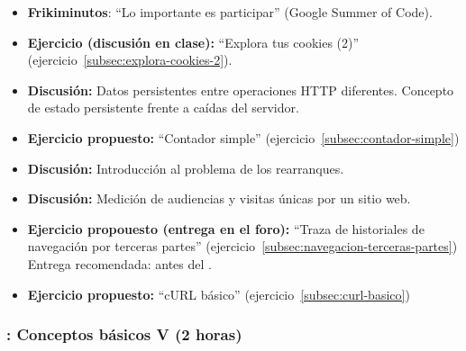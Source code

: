 \documentclass[a4paper,12pt]{article}
\begin{document}
\begin{itemize}
\item \textbf{Frikiminutos}: ``Lo importante es participar'' (Google Summer of Code).
\item \textbf{Ejercicio (discusión en clase):} ``Explora tus cookies (2)'' (ejercicio~\ref{subsec:explora-cookies-2}).
\item \textbf{Discusión:} Datos persistentes entre operaciones HTTP diferentes. Concepto de estado persistente frente a caídas del servidor.
\item \textbf{Ejercicio propuesto:} ``Contador simple'' (ejercicio~\ref{subsec:contador-simple})
\item \textbf{Discusión:} Introducción al problema de los rearranques.
\item \textbf{Discusión:} Medición de audiencias y visitas únicas por un sitio web.
\item \textbf{Ejercicio propouesto (entrega en el foro):} ``Traza de historiales de navegación por terceras partes'' (ejercicio~\ref{subsec:navegacion-terceras-partes}) \\
  Entrega recomendada: antes del \lunesE.
\item \textbf{Ejercicio propuesto:} ``cURL básico'' (ejercicio~\ref{subsec:curl-basico})
\end{itemize}

\subsubsection{\lunesE: Conceptos básicos V (2 horas)}
\label{cal:lunesE}
\end{document}
